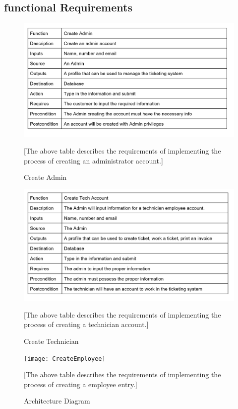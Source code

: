 \documentclass[letterpaper]{article}
\begin{document}
\subsection{functional Requirements}
\begin{figure}[htbp]
  \includegraphics[scale = .5]{CreateAdmin}
  \caption{Create Admin}[The above table describes the requirements of implementing the process of creating an administrator account.]
  \centering
\end{figure}

\begin{figure}[htbp]
  \includegraphics[scale = .5]{CreateTech}
  \caption{Create Technician}[The above table describes the requirements of implementing the process of creating a technician account.]
  \centering
\end{figure}

\begin{figure}[htbp]
  \texttt{[image: CreateEmployee]}
  \caption{Architecture Diagram}[The above table describes the requirements of implementing the process of creating a employee entry.]
  \centering
\end{figure}
\end{document}
